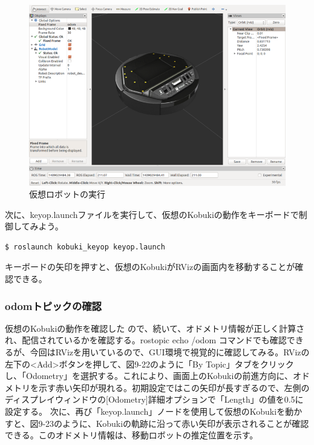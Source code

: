 \begin{itemize}
\begin{figure}[htp]
  \centering
  \includegraphics[width=12cm]{pictures/chapter9/pic_09_21.png}
  \caption{仮想ロボットの実行}
\end{figure}

次に、keyop.launchファイルを実行して、仮想のKobukiの動作をキーボードで制御してみよう。

\begin{lstlisting}[language=ROS]
$ roslaunch kobuki_keyop keyop.launch
\end{lstlisting}

キーボードの矢印を押すと、仮想のKobukiがRVizの画面内を移動することが確認できる。

\subsubsection{odomトピックの確認}

仮想のKobukiの動作を確認した  ので、続いて、オドメトリ情報が正しく計算され、配信されているかを確認する。rostopic echo /odom コマンドでも確認できるが、今回はRVizを用いているので、GUI環境で視覚的に確認してみる。RVizの左下の<Add>ボタンを押して、図9-22のように「By Topic」タブをクリックし、「Odometry」を選択する。これにより、画面上のKobukiの前進方向に、オドメトリを示す赤い矢印が現れる。初期設定ではこの矢印が長すぎるので、左側のディスプレイウィンドウの[Odometry]詳細オプションで「Length」の値を0.5に設定する。
次に、再び「keyop.launch」ノードを使用して仮想のKobukiを動かすと、図9-23のように、Kobukiの軌跡に沿って赤い矢印が表示されることが確認できる。このオドメトリ情報は、移動ロボットの推定位置を示す。


\end{itemize}
